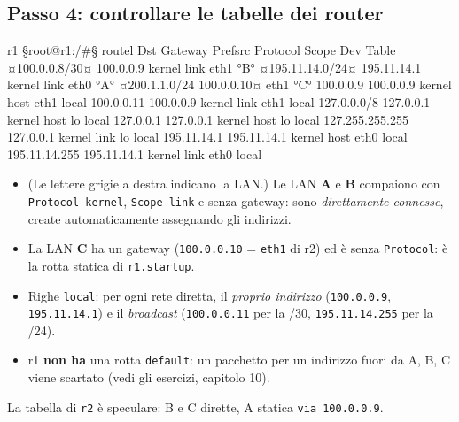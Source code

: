 \subsection{Passo 4: controllare le tabelle dei router}
\begin{terminale}{r1}
§root@r1:/#§ routel
Dst             Gateway      Prefsrc      Protocol Scope  Dev   Table
¤100.0.0.8/30¤                 100.0.0.9    kernel   link   eth1        °B°
¤195.11.14.0/24¤               195.11.14.1  kernel   link   eth0        °A°
¤200.1.1.0/24    100.0.0.10¤                                eth1        °C°
100.0.0.9                    100.0.0.9    kernel   host   eth1  local
100.0.0.11                   100.0.0.9    kernel   link   eth1  local
127.0.0.0/8                  127.0.0.1    kernel   host   lo    local
127.0.0.1                    127.0.0.1    kernel   host   lo    local
127.255.255.255              127.0.0.1    kernel   link   lo    local
195.11.14.1                  195.11.14.1  kernel   host   eth0  local
195.11.14.255                195.11.14.1  kernel   link   eth0  local
\end{terminale}
\begin{esempio}
\begin{itemize}
  \item (Le lettere grigie a destra indicano la LAN.) Le LAN \textbf{A} e \textbf{B} compaiono con \texttt{Protocol kernel}, \texttt{Scope link} e senza gateway: sono \emph{direttamente connesse}, create automaticamente assegnando gli indirizzi.
  \item La LAN \textbf{C} ha un gateway (\texttt{100.0.0.10} = \texttt{eth1} di r2) ed è senza \texttt{Protocol}: è la rotta statica di \texttt{r1.startup}.
  \item Righe \texttt{local}: per ogni rete diretta, il \emph{proprio indirizzo} (\texttt{100.0.0.9}, \texttt{195.11.14.1}) e il \emph{broadcast} (\texttt{100.0.0.11} per la /30, \texttt{195.11.14.255} per la /24).
  \item r1 \textbf{non ha} una rotta \texttt{default}: un pacchetto per un indirizzo fuori da A, B, C viene scartato (vedi gli esercizi, capitolo 10).
\end{itemize}
La tabella di \texttt{r2} è speculare: B e C dirette, A statica \texttt{via 100.0.0.9}.
\end{esempio}

